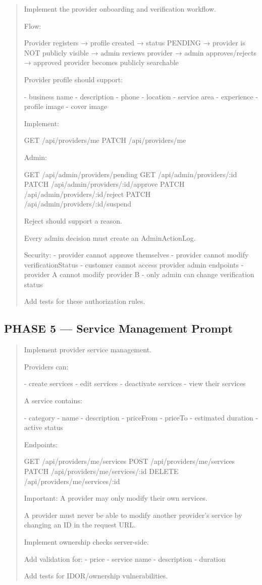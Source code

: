 \begin{quote}
Implement the provider onboarding and verification workflow.

Flow:

Provider registers
→ profile created
→ status PENDING
→ provider is NOT publicly visible
→ admin reviews provider
→ admin approves/rejects
→ approved provider becomes publicly searchable

Provider profile should support:

- business name
- description
- phone
- location
- service area
- experience
- profile image
- cover image

Implement:

GET /api/providers/me
PATCH /api/providers/me

Admin:

GET /api/admin/providers/pending
GET /api/admin/providers/:id
PATCH /api/admin/providers/:id/approve
PATCH /api/admin/providers/:id/reject
PATCH /api/admin/providers/:id/suspend

Reject should support a reason.

Every admin decision must create an AdminActionLog.

Security:
- provider cannot approve themselves
- provider cannot modify verificationStatus
- customer cannot access provider admin endpoints
- provider A cannot modify provider B
- only admin can change verification status

Add tests for these authorization rules.
\end{quote}

\subsection*{PHASE 5 --- Service Management Prompt}

\begin{quote}
Implement provider service management.

Providers can:

- create services
- edit services
- deactivate services
- view their services

A service contains:

- category
- name
- description
- priceFrom
- priceTo
- estimated duration
- active status

Endpoints:

GET /api/providers/me/services
POST /api/providers/me/services
PATCH /api/providers/me/services/:id
DELETE /api/providers/me/services/:id

Important:
A provider may only modify their own services.

A provider must never be able to modify another provider's service
by changing an ID in the request URL.

Implement ownership checks server-side.

Add validation for:
- price
- service name
- description
- duration

Add tests for IDOR/ownership vulnerabilities.
\end{quote}

